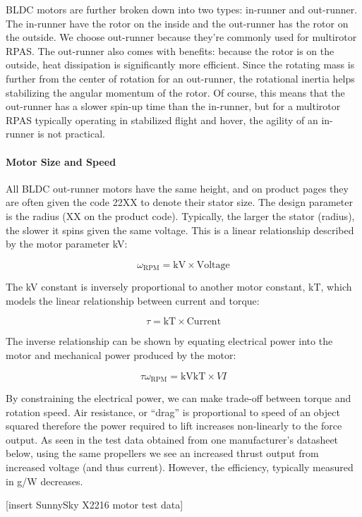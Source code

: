 BLDC motors are further broken down into two types: in-runner and out-runner. The in-runner have the rotor 
on the inside and the out-runner has the rotor on the outside. We choose out-runner because they’re 
commonly used for multirotor RPAS. The out-runner also comes with benefits: because the rotor is on the 
outside, heat dissipation is significantly more efficient. Since the rotating mass is further from the 
center of rotation for an out-runner, the rotational inertia helps stabilizing the angular momentum of the 
rotor. Of course, this means that the out-runner has a slower spin-up time than the in-runner, but for a 
multirotor RPAS typically operating in stabilized flight and hover, the agility of an in-runner is not 
practical.

\paragraph{Motor Size and Speed}

All BLDC out-runner motors have the same height, and on product pages they are often given the code 22XX to denote their stator size. The design parameter is the radius (XX on the product code). Typically, the larger the stator (radius), the slower it spins given the same voltage. This is a linear relationship described by the motor parameter kV:

$$
\omega_{\mathrm{RPM}} = \mathrm{kV} \times \mathrm{Voltage}
$$

The kV constant is inversely proportional to another motor constant, kT, which models the linear relationship between current and torque:

$$
\tau = \mathrm{kT} \times \mathrm{Current}
$$

The inverse relationship can be shown by equating electrical power into the motor and mechanical power produced by the motor:

$$
\tau\omega_{\mathrm{RPM}} = \mathrm{kV}\mathrm{kT}\times VI
$$

By constraining the electrical power, we can make trade-off between torque and rotation speed.
Air resistance, or “drag” is proportional to speed of an object squared therefore the power required to 
lift increases non-linearly to the force output. As seen in the test data obtained from one manufacturer’s 
datasheet below, using the same propellers we see an increased thrust output from increased voltage (and 
thus current). However, the efficiency, typically measured in g/W decreases. 

[insert SunnySky X2216 motor test data]

